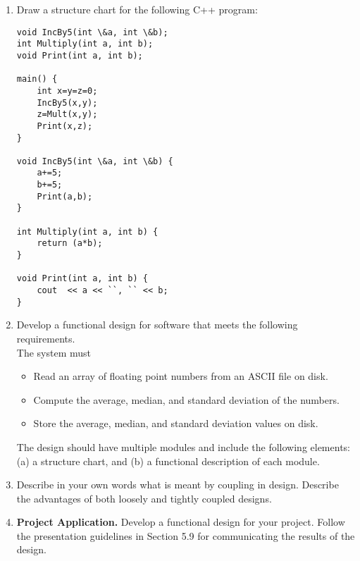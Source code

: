 \begin{enumerate}
  \item
    Draw a structure chart for the following C++ program:
\begin{verbatim}
void IncBy5(int \&a, int \&b);
int Multiply(int a, int b);
void Print(int a, int b);

main() {
    int x=y=z=0;
    IncBy5(x,y);
    z=Mult(x,y);
    Print(x,z);
}

void IncBy5(int \&a, int \&b) {
    a+=5;
    b+=5;
    Print(a,b);
}

int Multiply(int a, int b) {
    return (a*b);
}

void Print(int a, int b) {
    cout  << a << ``, `` << b;
}
\end{verbatim}

\item
  Develop a functional design for software that meets the following
  requirements. \\
The system must

\begin{itemize}
\item
  Read an array of floating point numbers from an ASCII file on disk.
\item
  Compute the average, median, and standard deviation of the numbers.
\item
  Store the average, median, and standard deviation values on disk.
\end{itemize}

The design should have multiple modules and include the following
elements: (a) a structure chart, and (b) a functional description of
each module.



\item
  Describe in your own words what is meant by coupling in design.
  Describe the advantages of both loosely and tightly coupled designs.
\item
  \textbf{Project Application.} Develop a functional design for your
  project. Follow the presentation guidelines in Section 5.9 for
  communicating the results of the design.
\end{enumerate}

